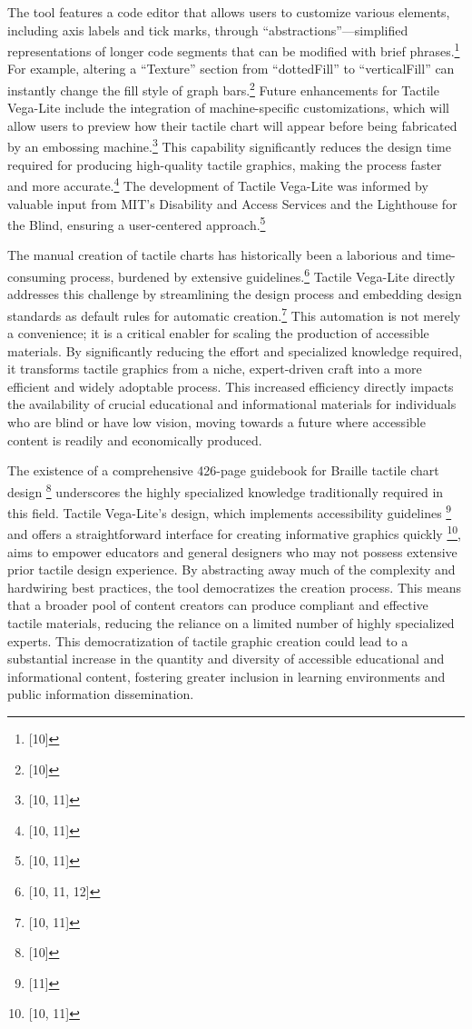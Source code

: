 The tool features a code editor that allows users to customize various elements, including axis labels and tick marks, through ``abstractions''---simplified representations of longer code segments that can be modified with brief phrases.\footnote{[10]} For example, altering a ``Texture'' section from ``dottedFill'' to ``verticalFill'' can instantly change the fill style of graph bars.\footnote{[10]} Future enhancements for Tactile Vega-Lite include the integration of machine-specific customizations, which will allow users to preview how their tactile chart will appear before being fabricated by an embossing machine.\footnote{[10, 11]} This capability significantly reduces the design time required for producing high-quality tactile graphics, making the process faster and more accurate.\footnote{[10, 11]} The development of Tactile Vega-Lite was informed by valuable input from MIT's Disability and Access Services and the Lighthouse for the Blind, ensuring a user-centered approach.\footnote{[10, 11]}

The manual creation of tactile charts has historically been a laborious and time-consuming process, burdened by extensive guidelines.\footnote{[10, 11, 12]} Tactile Vega-Lite directly addresses this challenge by streamlining the design process and embedding design standards as default rules for automatic creation.\footnote{[10, 11]} This automation is not merely a convenience; it is a critical enabler for scaling the production of accessible materials. By significantly reducing the effort and specialized knowledge required, it transforms tactile graphics from a niche, expert-driven craft into a more efficient and widely adoptable process. This increased efficiency directly impacts the availability of crucial educational and informational materials for individuals who are blind or have low vision, moving towards a future where accessible content is readily and economically produced.

The existence of a comprehensive 426-page guidebook for Braille tactile chart design \footnote{[10]} underscores the highly specialized knowledge traditionally required in this field. Tactile Vega-Lite's design, which implements accessibility guidelines \footnote{[11]} and offers a straightforward interface for creating informative graphics quickly \footnote{[10, 11]}, aims to empower educators and general designers who may not possess extensive prior tactile design experience. By abstracting away much of the complexity and hardwiring best practices, the tool democratizes the creation process. This means that a broader pool of content creators can produce compliant and effective tactile materials, reducing the reliance on a limited number of highly specialized experts. This democratization of tactile graphic creation could lead to a substantial increase in the quantity and diversity of accessible educational and informational content, fostering greater inclusion in learning environments and public information dissemination.

